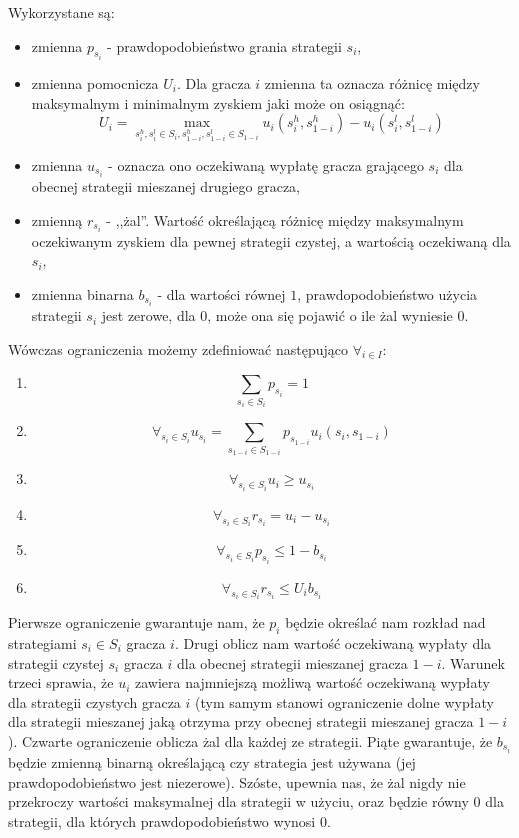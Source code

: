 \documentclass[polish]{standalone}
\begin{document}
Wykorzystane są: 
\begin{itemize}
\item zmienna $p_{s_i}$ - prawdopodobieństwo grania strategii $s_i$,
\item zmienna pomocnicza $U_i$. Dla gracza $i$ zmienna ta oznacza różnicę między maksymalnym i minimalnym zyskiem jaki
może on osiągnąć:
$$U_i = \max_{s_i^h, s_i^l \in S_i, s_{1-i}^h, s_{1-i}^l \in S_{1-i}} u_i(s_i^h, s_{1-i}^h) - u_i(s_i^l, s_{1-i}^l)$$
\item zmienna $u_{s_i}$ - oznacza ono oczekiwaną wypłatę gracza grającego $s_i$ dla obecnej strategii mieszanej drugiego
gracza,
\item zmienną $r_{s_i}$ - ,,żal''. Wartość określającą różnicę między maksymalnym oczekiwanym zyskiem dla pewnej
strategii czystej, a wartością oczekiwaną dla $s_i$,
\item zmienna binarna $b_{s_i}$ - dla wartości równej $1$, prawdopodobieństwo użycia strategii $s_i$ jest zerowe,
dla $0$, może ona się pojawić o ile żal wyniesie $0$.
\end{itemize}

Wówczas ograniczenia możemy zdefiniować następująco $\forall_{i \in I}$:
\begin{enumerate}
\item $$\sum_{{s_i} \in S_i} p_{s_i} = 1$$
\item $$\forall_{s_i \in S_i} u_{s_i} = \sum_{s_{1-i} \in S_{1-i}} p_{s_{1-i}} u_i(s_i, s_{1-i})$$
\item $$\forall_{s_i \in S_i} u_i \geq u_{s_i}$$
\item $$\forall_{s_i \in S_i} r_{s_i} = u_i - u_{s_i}$$
\item $$\forall_{s_i \in S_i} p_{s_i} \leq 1-b_{s_i}$$
\item $$\forall_{s_i \in S_i} r_{s_i} \leq U_i b_{s_i}$$
\end{enumerate}

Pierwsze ograniczenie gwarantuje nam, że $p_i$ będzie określać nam rozkład nad strategiami $s_i \in S_i$ gracza $i$.
Drugi oblicz nam wartość oczekiwaną wypłaty dla strategii czystej $s_i$ gracza $i$ dla obecnej strategii mieszanej
gracza $1-i$. Warunek trzeci sprawia, że $u_i$ zawiera najmniejszą możliwą wartość oczekiwaną wypłaty dla strategii
czystych gracza $i$ (tym samym stanowi ograniczenie dolne wypłaty dla strategii mieszanej jaką otrzyma przy obecnej
strategii mieszanej gracza $1-i$). Czwarte ograniczenie oblicza żal dla każdej ze strategii. Piąte gwarantuje, że
$b_{s_i}$ będzie zmienną binarną określającą czy strategia jest używana (jej prawdopodobieństwo jest niezerowe). Szóste,
upewnia nas, że żal nigdy nie przekroczy wartości maksymalnej dla strategii w użyciu, oraz będzie równy 0 dla strategii,
dla których prawdopodobieństwo wynosi 0.
\end{document}
